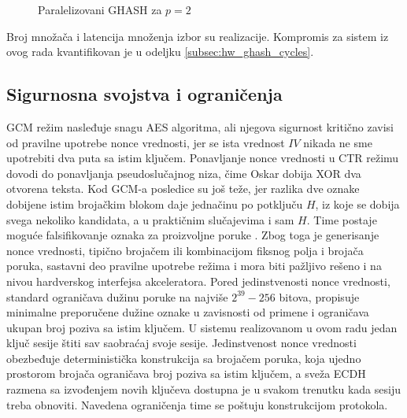 \begin{figure}[H]
\centering
{}
\caption{Paralelizovani GHASH za $p=2$}
\label{fig:ghash_paralelno}
\end{figure}

Broj množača i latencija množenja izbor su realizacije. Kompromis za sistem iz ovog rada kvantifikovan je u odeljku \ref{subsec:hw_ghash_cycles}.

\subsection{Sigurnosna svojstva i ograničenja}
\label{subsec:gcm_sigurnost}

GCM režim nasleđuje snagu AES algoritma, ali njegova sigurnost kritično zavisi od pravilne upotrebe nonce vrednosti, jer se ista vrednost $IV$ nikada ne sme upotrebiti dva puta sa istim ključem. Ponavljanje nonce vrednosti u CTR režimu dovodi do ponavljanja pseudoslučajnog niza, čime Oskar dobija XOR dva otvorena teksta. Kod GCM-a posledice su još teže, jer razlika dve oznake dobijene istim brojačkim blokom daje jednačinu po potključu $H$, iz koje se dobija svega nekoliko kandidata, a u praktičnim slučajevima i sam $H$. Time postaje moguće falsifikovanje oznaka za proizvoljne poruke \cite{joux_gcm}. Zbog toga je generisanje nonce vrednosti, tipično brojačem ili kombinacijom fiksnog polja i brojača poruka, sastavni deo pravilne upotrebe režima i mora biti pažljivo rešeno i na nivou hardverskog interfejsa akceleratora.
\smallbreak
Pored jedinstvenosti nonce vrednosti, standard \cite{sp80038d} ograničava dužinu poruke na najviše $2^{39}-256$ bitova, propisuje minimalne preporučene dužine oznake u zavisnosti od primene i ograničava ukupan broj poziva sa istim ključem. U sistemu realizovanom u ovom radu jedan ključ sesije štiti sav saobraćaj svoje sesije. Jedinstvenost nonce vrednosti obezbeđuje deterministička konstrukcija sa brojačem poruka, koja ujedno prostorom brojača ograničava broj poziva sa istim ključem, a sveža ECDH razmena sa izvođenjem novih ključeva dostupna je u svakom trenutku kada sesiju treba obnoviti. Navedena ograničenja time se poštuju konstrukcijom protokola.
